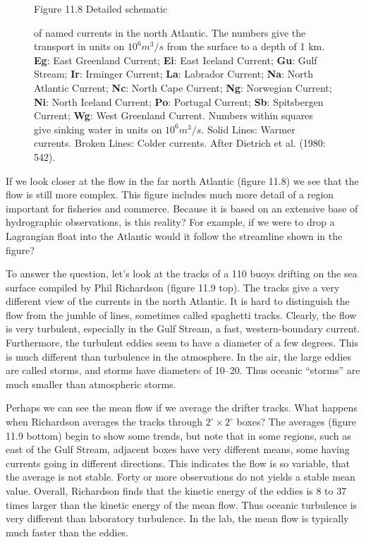 \begin{figure}[t!]
\footnotesize
Figure 11.8 Detailed schematic \rule{0mm}{3ex}of named currents in the north Atlantic.
The numbers give the transport in units on $10^6 m^3/s$ from
the surface to a depth of 1 km. \textbf{Eg}: East Greenland Current; \textbf{Ei}: East Iceland
Current; \textbf{Gu}: Gulf Stream;
\textbf{Ir}: Irminger Current; \textbf{La}: Labrador Current; \textbf{Na}: North
Atlantic Current; \textbf{Nc}: North Cape Current; \textbf{Ng}: Norwegian Current;
\textbf{Ni}: North Iceland Current; \textbf{Po}: Portugal Current; \textbf{Sb}:
Spitsbergen Current; \textbf{Wg}: West Greenland Current. Numbers within squares
give sinking water in  units on $10^6 m^3 /s$. Solid Lines: Warmer
currents. Broken Lines: Colder currents. After Dietrich et al. (1980: 542).
\label{fig:NATLcur1}
\vspace{-3ex}
\end{figure}

If we look closer at the flow in the far north Atlantic (figure 11.8) we see that
the flow is still more complex. This figure includes much more detail of a region
important for fisheries and commerce. Because it is based on an extensive base of
hydrographic observations, is this reality? For example, if we were to drop a
Lagrangian float into the Atlantic would it follow the streamline shown in the
figure?

To answer the question, let's look at the tracks of a 110 buoys drifting on the
sea surface compiled by Phil Richardson (figure 11.9 top). The tracks give a very
different view of the currents in the north Atlantic. It is hard to distinguish
the flow from the jumble of lines, sometimes called spaghetti tracks. Clearly, the
flow is very turbulent, especially in the Gulf Stream, a fast, western-boundary
current. Furthermore, the turbulent eddies seem to have a diameter of a few
degrees. This is much different than turbulence in the atmosphere. In the
air, the large eddies are called storms, and storms have diameters of
10\degrees --20\degrees. Thus oceanic ``storms'' are much smaller than atmospheric
storms.

Perhaps we can see the mean flow if we average the drifter tracks. What happens
when Richardson averages the tracks through $2^{\circ}
\times 2^{\circ}$ boxes? The averages (figure 11.9 bottom) begin to show some
trends, but note that in some regions, such as east of the Gulf Stream, adjacent
boxes have very different means, some having currents going in different
directions. This indicates the flow is so variable, that the average is not
stable. Forty or more observations do not yields a stable mean value. Overall,
Richardson finds that the kinetic energy of the eddies is 8 to 37 times larger
than the kinetic energy of the  mean flow. Thus oceanic turbulence is
very different than laboratory turbulence. In the lab, the mean
flow is typically much faster than the eddies.

